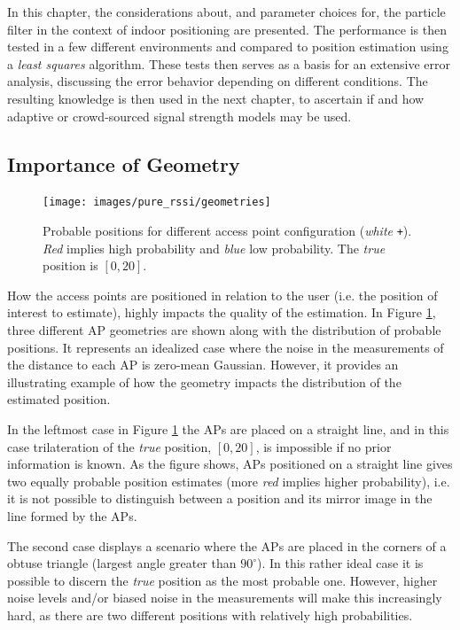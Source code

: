 \documentclass{LTHthesis}
\begin{document}
In this chapter, the considerations about, and parameter choices for, the particle filter in the context of indoor positioning are presented. The performance is then tested in a few different environments and compared to position estimation using a \emph{least squares} algorithm.  These tests then serves as a basis for an extensive error analysis, discussing the error behavior depending on different conditions. The resulting knowledge is then used in the next chapter, to ascertain if and how adaptive or crowd-sourced signal strength models may be used.
%
\subsection{Importance of Geometry}
%
\begin{figure}[!hbt]

\texttt{[image: images/pure\_rssi/geometries]}
\caption{Probable positions for different access point configuration (\emph{white} \texttt{+}). \emph{Red} implies high probability and \emph{blue} low probability. The \emph{true} position is $[0, 20]$.}\label{geometries}
\end{figure}
%
How the access points are positioned in relation to the user (i.e. the position of interest to estimate), highly impacts the quality of the estimation. In Figure \ref{geometries}, three different AP geometries are shown along with the distribution of probable positions. It represents an idealized case where the noise in the measurements of the distance to each AP is zero-mean Gaussian. However, it provides an illustrating example of how the geometry impacts the distribution of the estimated position.

In the leftmost case in Figure \ref{geometries} the APs are placed on a straight line, and in this case trilateration of the \emph{true} position, $[0,20]$, is impossible if no prior information is known. As the figure shows, APs positioned on a straight line gives two equally probable position estimates (more \emph{red} implies higher probability), i.e. it is not possible to distinguish between a position and its mirror image in the line formed by the APs. 

The second case displays a scenario where the APs are placed in the corners of a obtuse triangle (largest angle greater than $90^\circ$). In this rather ideal case it is possible to discern the \emph{true} position as the most probable one. However, higher noise levels and/or biased noise in the measurements will make this increasingly hard, as there are two different positions with relatively high probabilities.
\end{document}
